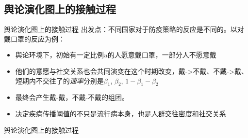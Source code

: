 \subsection{舆论演化图上的接触过程}
\begin{frame}{舆论演化图上的接触过程}
    出发点：不同国家对于防疫策略的反应是不同的。以对戴口罩的反应为例：
    \begin{itemize}
        \item 舆论环境下，初始有一定比例$u$的人愿意戴口罩，一部分人不愿意戴
        \item 他们的意愿与社交关系也会共同演变在这个时期改变，戴->不戴、不戴->戴、短期内不交往了的\textit{速率}分别是$\beta_1$, $\beta_2$, $1-\beta_1-\beta_2$
        \item 最终会产生戴-戴，不戴-不戴的组团。
        \item 决定疾病传播阈值的不只是流行病本身，也是人群交往密度和社交关系
    \end{itemize}
\end{frame}

\begin{frame}{舆论演化图上的接触过程}
    \begin{figure}[htbp]
\centering
{}%
%
%
\centering
\end{figure}
\end{frame}

